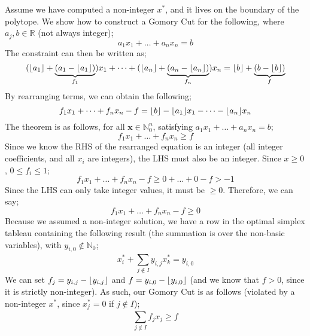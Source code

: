 \documentclass[a4paper, 12pt]{article}
\DeclarePairedDelimiter{\floor}{\lfloor}{\rfloor}
\newcommand{\summation}[2]{\sum\limits_{#1}^{#2}}
\renewcommand{\vec}[1]{\boldsymbol{#1}}
\begin{document}
                Assume we have computed a non-integer $x^*$, and it lives on the boundary of the polytope.
                We show how to construct a Gomory Cut for the following, where $a_j, b \in \mathbb{R}$ (not always integer);
                $$a_1 x_1 + \dots + a_n x_n = b$$
                The constraint can then be written as;
                $$(\floor{a_1} + \underbrace{(a_1 - \floor{a_1})}_{f_1})x_1 + \dots + (\floor{a_n} + \underbrace{(a_n - \floor{a_n})}_{f_n})x_n = \floor{b} + \underbrace{(b - \floor{b})}_f$$
                By rearranging terms, we can obtain the following;
                $$f_1 x_1 + \dots + f_n x_n - f = \floor{b} - \floor{a_1} x_1 - \dots - \floor{a_n} x_n$$
                The theorem is as follows, for all $\vec{x} \in \mathbb{N}^n_0$, satisfying $a_1 x_1 + \dots + a_n x_n = b$;
                $$f_1 x_1 + \dots + f_n x_n \geq f$$
                Since we know the RHS of the rearranged equation is an integer (all integer coefficients, and all $x_i$ are integers), the LHS must also be an integer.
                Since $x \geq 0$, $0 \leq f_i \leq 1$;
                $$f_1 x_1 + \dots + f_n x_n - f \geq 0 + \dots + 0 - f > -1$$
                Since the LHS can only take integer values, it must be $\geq 0$.
                Therefore, we can say;
                $$f_1 x_1 + \dots + f_n x_n - f \geq 0$$
                Because we assumed a non-integer solution, we have a row in the optimal simplex tableau containing the following result (the summation is over the non-basic variables), with $y_{i, 0} \notin \mathbb{N}_0$;
                $$x^*_i + \summation{j \notin I}{} y_{i, j} x^*_k = y_{i, 0}$$
                We can set $f_j = y_{i, j} - \floor{y_{i, j}}$ and $f = y_{i, 0} - \floor{y_{i, 0}}$ (and we know that $f > 0$, since it is strictly non-integer).
                As such, our Gomory Cut is as follows (violated by a non-integer $x^*$, since $x^*_j = 0$ if $j \notin I$);
                $$\summation{j \notin I}{} f_j x_j \geq f$$
\end{document}
